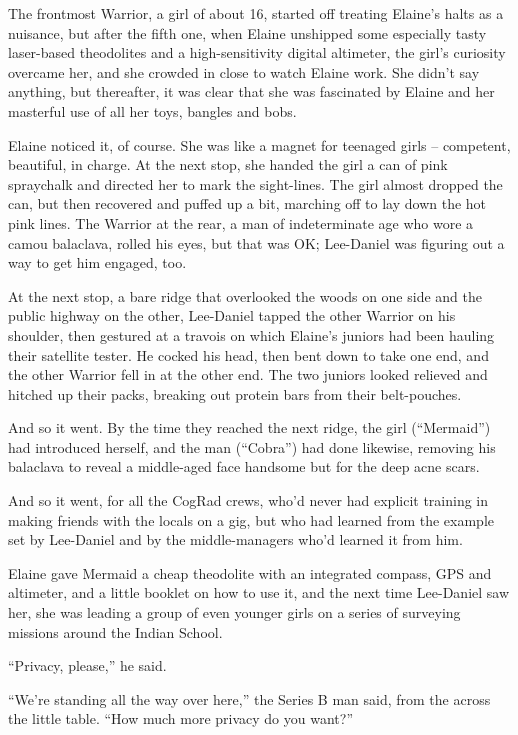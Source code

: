 The frontmost Warrior, a girl of about 16, started off treating 
Elaine's halts as a nuisance, but after the fifth one, when Elaine 
unshipped some especially tasty laser-based theodolites and a 
high-sensitivity digital altimeter, the girl's curiosity overcame her, 
and she crowded in close to watch Elaine work. She didn't say anything, 
but thereafter, it was clear that she was fascinated by Elaine and her 
masterful use of all her toys, bangles and bobs.

Elaine noticed it, of course. She was like a magnet for teenaged girls 
-- competent, beautiful, in charge. At the next stop, she handed the 
girl a can of pink spraychalk and directed her to mark the sight-lines. 
The girl almost dropped the can, but then recovered and puffed up a 
bit, marching off to lay down the hot pink lines. The Warrior at the 
rear, a man of indeterminate age who wore a camou balaclava, rolled his 
eyes, but that was OK; Lee-Daniel was figuring out a way to get him 
engaged, too.

At the next stop, a bare ridge that overlooked the woods on one side 
and the public highway on the other, Lee-Daniel tapped the other 
Warrior on his shoulder, then gestured at a travois on which Elaine's 
juniors had been hauling their satellite tester. He cocked his head, 
then bent down to take one end, and the other Warrior fell in at the 
other end. The two juniors looked relieved and hitched up their packs, 
breaking out protein bars from their belt-pouches.

And so it went. By the time they reached the next ridge, the girl 
(“Mermaid”) had introduced herself, and the man (“Cobra”) had 
done likewise, removing his balaclava to reveal a middle-aged face 
handsome but for the deep acne scars.

And so it went, for all the CogRad crews, who'd never had explicit 
training in making friends with the locals on a gig, but who had 
learned from the example set by Lee-Daniel and by the middle-managers 
who'd learned it from him.

Elaine gave Mermaid a cheap theodolite with an integrated compass, GPS 
and altimeter, and a little booklet on how to use it, and the next time 
Lee-Daniel saw her, she was leading a group of even younger girls on a 
series of surveying missions around the Indian School.

\tb

“Privacy, please,” he said.

“We're standing all the way over here,” the Series B man said, from 
the across the little table. “How much more privacy do you want?”

